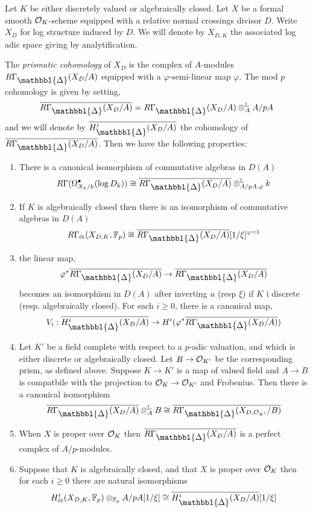 \documentclass[12pt]{article}
\newcommand{\Prism}{{\mathlarger{\mathbbl{\Delta}}}}
\begin{document}
Let $K$ be either discretely valued or algebraically closed. Let $X$ be a formal smooth $\mathcal{O}_K$-scheme equipped with a relative normal crossings divisor $D$. Write $X_D$ for log structure induced by $D$. We will denote by $X_{D,K}$ the associated log adic space giving by analytification. 
\par 
The \textit{prismatic cohomology} of $X_D$ is the complex of $A$-modules $R \Gamma_{\Prism}(X_D/A)$ equipped with a $\varphi$-semi-linear map $\varphi$. The mod $p$ cohomology is given by setting,
\[ \ol{R \Gamma_{\Prism}(X_D/A)} = R \Gamma_{\Prism}(X_D/A) \ot_A^{\LL} A / p A \]
and we will denote by $\ol{H^i_{\Prism}(X_D/A)}$ the cohomology of $\ol{R \Gamma_{\Prism}(X_D/A)}$. Then we have the following properties:
\begin{enumerate}
\item There is a canonical isomorphism of commutative algebras in $D(A)$
\[ R \Gamma(\Omega^\bullet_{X_k/k}(\log{D_k})) \cong \ol{R \Gamma_{\Prism}(X_D/A)} \ot^{\LL}_{A/pA, \varphi} k \]
\item If $K$ is algebraically closed then there is an isomorphism of commutative algebras in $D(A)$
\[ R \Gamma_{\et}(X_{D,K}, \FF_p) \cong \ol{R \Gamma_{\Prism}(X_D/A)}[1/\xi]^{\varphi=1} \]
\item the linear map,
\[ \varphi^* \ol{R \Gamma_{\Prism}(X_D/A)} \to \ol{R \Gamma_{\Prism}(X_D/A)} \]
becomes an isomorphism in $D(A)$ after inverting $u$ (resp $\xi$) if $K$ i discrete (resp. algebraically closed). For each $i \ge 0$, there is a canonical map,
\[ V_i : \ol{H^i_{\Prism}(X_D/A)} \to H^i(\varphi^* \ol{R \Gamma_{\Prism}(X_D/A)}) \]
\item Let $K'$ be a field complete with respect to a $p$-adic valuation, and which is either discrete or algebraically closed. Let $B \to \mathcal{O}_{K'}$ be the corresponding prism, as defined above. Suppose $K \to K'$ is a map of valued field and $A \to B$ is compatbile with the projection to $\mathcal{O}_K \to \mathcal{O}_{K'}$ and Frobenius. Then there is a canonical isomorphism
\[ \ol{R \Gamma_{\Prism}(X_D/A)} \ot_A^{\LL} B \cong \ol{R \Gamma_{\Prism}(X_{D, \cO_{K'}}/B)} \]
\item When $X$ is proper over $\mathcal{O}_K$ then $\ol{R \Gamma_{\Prism}(X_D/A)}$ is a perfect complex of $A/p$-modules.
\item Suppose that $K$ is algebraically closed, and that $X$ is proper over $\mathcal{O}_K$ then for each $i \ge 0$ there are natural isomorphisms
\[ H^i_{\et}(X_{D,K}, \FF_p) \ot_{\FF_p} A / p A[1/\xi] \cong \ol{H^i_{\Prism}(X_D/A)}[1/\xi] \]
\end{enumerate}
\end{document}
